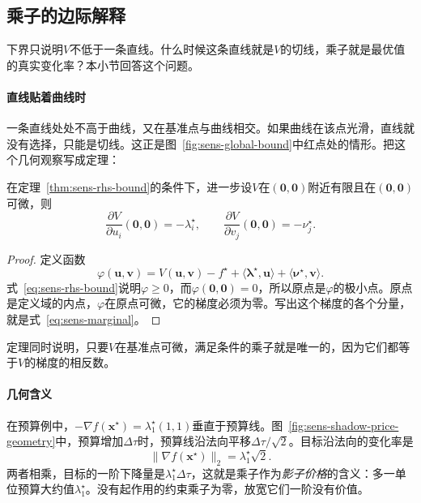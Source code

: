 \subsection{乘子的边际解释}
\label{sec:sens-marginal}

下界只说明$V$不低于一条直线。什么时候这条直线就是$V$的切线，乘子就是最优值的真实变化率？本小节回答这个问题。

\paragraph{直线贴着曲线时}
一条直线处处不高于曲线，又在基准点与曲线相交。如果曲线在该点光滑，直线就没有选择，只能是切线。这正是图~\ref{fig:sens-global-bound}中红点处的情形。把这个几何观察写成定理：

\begin{theorem}[乘子是边际变化率]
\label{thm:sens-marginal}
在定理~\ref{thm:sens-rhs-bound}的条件下，进一步设$V$在$(\bm{0},\bm{0})$附近有限且在$(\bm{0},\bm{0})$可微，则
\begin{equation}
 \frac{\partial V}{\partial u_i}(\bm{0},\bm{0})=-\lambda_i^\star,
 \qquad
 \frac{\partial V}{\partial v_j}(\bm{0},\bm{0})=-\nu_j^\star.
 \label{eq:sens-marginal}
\end{equation}
\end{theorem}

\begin{proof}
定义函数
\[
 \varphi(\bm{u},\bm{v})=V(\bm{u},\bm{v})-f^\star+\langle\bm{\lambda}^\star,\bm{u}\rangle+\langle\bm{\nu}^\star,\bm{v}\rangle.
\]
式~\eqref{eq:sens-rhs-bound}说明$\varphi\geq0$，而$\varphi(\bm{0},\bm{0})=0$，所以原点是$\varphi$的极小点。原点是定义域的内点，$\varphi$在原点可微，它的梯度必须为零。写出这个梯度的各个分量，就是式~\eqref{eq:sens-marginal}。
\end{proof}

定理同时说明，只要$V$在基准点可微，满足条件的乘子就是唯一的，因为它们都等于$V$的梯度的相反数。

\paragraph{几何含义}
在预算例中，$-\nabla f(\bm{x}^\star)=\lambda_1^\star(1,1)$垂直于预算线。图~\ref{fig:sens-shadow-price-geometry}中，预算增加$\Delta\tau$时，预算线沿法向平移$\Delta\tau/\sqrt{2}$。目标沿法向的变化率是
\[
 \lVert\nabla f(\bm{x}^\star)\rVert_2=\lambda_1^\star\sqrt{2}.
\]
两者相乘，目标的一阶下降量是$\lambda_1^\star\Delta\tau$，这就是乘子作为\emph{影子价格}的含义：多一单位预算大约值$\lambda_1^\star$。没有起作用的约束乘子为零，放宽它们一阶没有价值。

